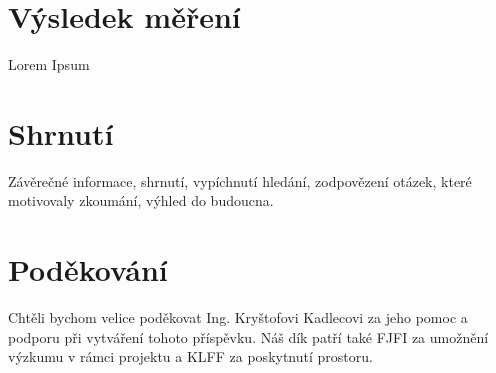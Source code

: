 \documentclass[12pt,a4paper]{article}
\begin{document}
\section{Výsledek měření}
Lorem Ipsum

\section{Shrnutí}
Závěrečné informace, shrnutí, vypíchnutí hledání, zodpovězení otázek, které motivovaly zkoumání, výhled do budoucna.



\section*{Poděkování}
Chtěli bychom velice poděkovat Ing. Kryštofovi Kadlecovi za jeho pomoc a podporu při vytváření tohoto příspěvku.
Náš dík patří také FJFI za umožnění výzkumu v rámci projektu a KLFF za poskytnutí prostoru.
\printbibliography
\end{document}
